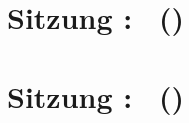 \documentclass[ngerman]{article}
\begin{document}
\title{\lectype\ \lecfulltitle}

\author{\lecinstructor}

\date{\lecsemester}

\maketitle


\section*{Sitzung \sesnr: \sesfulltitle\ (\sesdate)}

\lipsum


\section*{Sitzung \sesnr: \sesfulltitle\ (\sesdate)}

\lipsum
\end{document}
